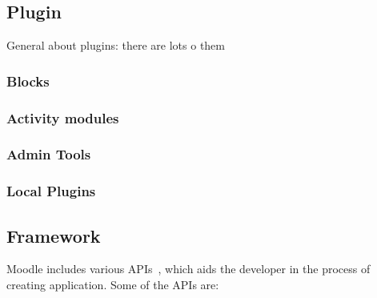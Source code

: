 \subsection{Plugin}
	General about plugins: there are lots o them 




	\subsubsection{Blocks}
	\label{subsec:blocks}





	\subsubsection{Activity modules}





	\subsubsection{Admin Tools}






	\subsubsection{Local Plugins}




\subsection{Framework}
  Moodle includes various APIs~\cite{moodlecoreapis}, which aids the developer in the process of creating application. Some of the APIs are:
	

